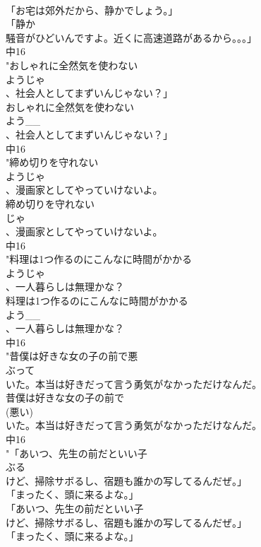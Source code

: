 \documentclass[8pt]{extreport}
\begin{document}
\begin{CJK}{UTF8}{min}
\\	「お宅は郊外だから、静かでしょう。」
\\	「静か
\\	騒音がひどいんですよ。近くに高速道路があるから。。。」
\\	中16
\\	"おしゃれに全然気を使わない
\\	ようじゃ
\\	、社会人としてまずいんじゃない？」
\\	おしゃれに全然気を使わない
\\	よう__
\\	、社会人としてまずいんじゃない？」
\\	中16
\\	"締め切りを守れない
\\	ようじゃ
\\	、漫画家としてやっていけないよ。
\\	締め切りを守れない
\\	じゃ
\\	、漫画家としてやっていけないよ。
\\	中16
\\	"料理は1つ作るのにこんなに時間がかかる
\\	ようじゃ
\\	、一人暮らしは無理かな？
\\	料理は1つ作るのにこんなに時間がかかる
\\	よう__
\\	、一人暮らしは無理かな？
\\	中16
\\	"昔僕は好きな女の子の前で悪
\\	ぶって
\\	いた。本当は好きだって言う勇気がなかっただけなんだ。
\\	昔僕は好きな女の子の前で
\\	(悪い)
\\	いた。本当は好きだって言う勇気がなかっただけなんだ。
\\	中16
\\	"「あいつ、先生の前だといい子
\\	ぶる
\\	けど、掃除サボるし、宿題も誰かの写してるんだぜ。」
\\	「まったく、頭に来るよな。」
\\	「あいつ、先生の前だといい子
\\	けど、掃除サボるし、宿題も誰かの写してるんだぜ。」
\\	「まったく、頭に来るよな。」

\end{CJK}
\end{document}
